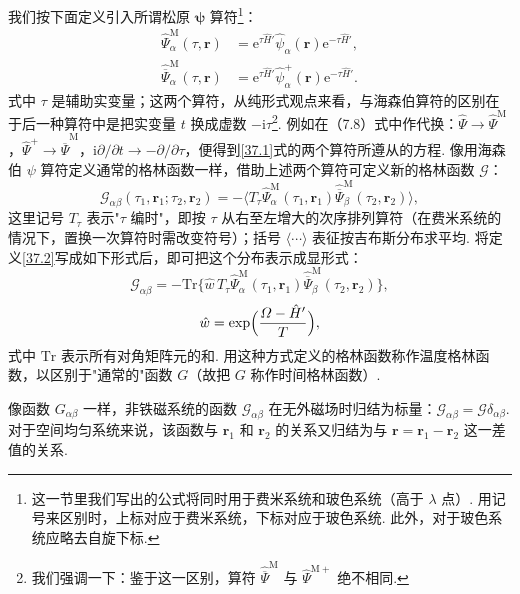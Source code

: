 我们按下面定义引入所谓松原 $\bm\psi$ 算符\footnote{这一节里我们写出的公式将同时用于费米系统和玻色系统（高于 $\lambda$ 点）. 用记号来区别时，上标对应于费米系统，下标对应于玻色系统. 此外，对于玻色系统应略去自旋下标.}：
\begin{equation}
\begin{aligned}
\hat\Psi^{\mathrm M}_{\alpha}(\tau,\bm r)&=\mathrm{e}^{\tau\hat H'}\hat\psi_{\alpha}(\bm r)\mathrm{e}^{-\tau\hat H'},\\
\hat{\overline\Psi}^{\mathrm M}_{\alpha}(\tau,\bm r)&=\mathrm{e}^{\tau\hat H'}\hat\psi^{+}_{\alpha}(\bm r)\mathrm{e}^{-\tau\hat H'}.
\end{aligned}
\label{37.1}
\end{equation}
式中 $\tau$ 是辅助实变量；这两个算符，从纯形式观点来看，与海森伯算符的区别在于后一种算符中是把实变量 $t$ 换成虚数 $-\mathrm{i}\tau$\footnote{我们强调一下：鉴于这一区别，算符 $\hat{\overline\Psi}^{\mathrm M}$ 与 $\hat\Psi^{\mathrm M+}$ 绝不相同.}. 例如在（7.8）式中作代换：$\hat\Psi\to\hat\Psi^{\mathrm M}$，$\hat\Psi^{+}\to\hat{\overline\Psi}^{\mathrm M}$，$\mathrm{i}\partial/\partial t\to-\partial/\partial\tau$，便得到\eqref{37.1}式的两个算符所遵从的方程. 像用海森伯 $\psi$ 算符定义通常的格林函数一样，借助上述两个算符可定义新的格林函数 $\mathcal G$：
\begin{equation}
\mathcal G_{\alpha\beta}(\tau_1,\bm r_1;\tau_2,\bm r_2)
=-\bigl\langle T_\tau\hat\Psi^{\mathrm M}_{\alpha}(\tau_1,\bm r_1)\hat{\overline\Psi}^{\mathrm M}_{\beta}(\tau_2,\bm r_2)\bigr\rangle,
\label{37.2}
\end{equation}
这里记号 $T_\tau$ 表示"$\tau$ 编时"，即按 $\tau$ 从右至左增大的次序排列算符（在费米系统的情况下，置换一次算符时需改变符号）；括号 $\langle\cdots\rangle$ 表征按吉布斯分布求平均. 将定义\eqref{37.2}写成如下形式后，即可把这个分布表示成显形式：
\begin{equation*}
\mathcal G_{\alpha\beta}=-\mathrm{Tr}\bigl\{\hat w\,T_\tau\hat\Psi^{\mathrm M}_{\alpha}(\tau_1,\bm r_1)\hat{\overline\Psi}^{\mathrm M}_{\beta}(\tau_2,\bm r_2)\bigr\},
\end{equation*}
\begin{equation}
\hat w=\exp\Bigl(\frac{\varOmega-\hat H'}{T}\Bigr),
\label{37.3}
\end{equation}
式中 $\mathrm{Tr}$ 表示所有对角矩阵元的和. 用这种方式定义的格林函数称作{\heiti 温度格林函数}，以区别于"通常的"函数 $G$（故把 $G$ 称作{\heiti 时间格林函数}）.

像函数 $G_{\alpha\beta}$ 一样，非铁磁系统的函数 $\mathcal G_{\alpha\beta}$ 在无外磁场时归结为标量：$\mathcal G_{\alpha\beta}=\mathcal G\delta_{\alpha\beta}$. 对于空间均匀系统来说，该函数与 $\bm r_1$ 和 $\bm r_2$ 的关系又归结为与 $\bm r=\bm r_1-\bm r_2$ 这一差值的关系.

